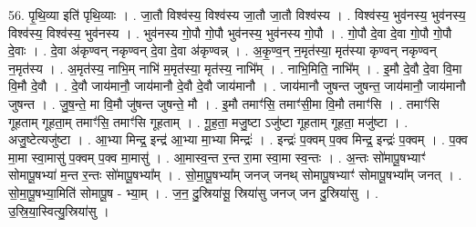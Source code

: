 \documentclass[17pt]{extarticle}
\begin{document}
56. पृ॒थि॒व्या इति॑ पृथि॒व्याः । . जा॒तौ विश्व॑स्य॒ विश्व॑स्य जा॒तौ जा॒तौ विश्व॑स्य । . विश्व॑स्य॒ भुव॑नस्य॒ भुव॑नस्य॒ विश्व॑स्य॒ विश्व॑स्य॒ भुव॑नस्य । . भुव॑नस्य गो॒पौ गो॒पौ भुव॑नस्य॒ भुव॑नस्य गो॒पौ । . गो॒पौ दे॒वा दे॒वा गो॒पौ गो॒पौ दे॒वाः । . दे॒वा अ॑कृण्वन् नकृण्वन् दे॒वा दे॒वा अ॑कृण्वन्न् । . अ॒कृ॒ण्व॒न् न॒मृत॑स्या॒ मृत॑स्या कृण्वन् नकृण्वन् न॒मृत॑स्य । . अ॒मृत॑स्य॒ नाभि॒म् नाभि॑ म॒मृत॑स्या॒ मृत॑स्य॒ नाभि᳚म् । . नाभि॒मिति॒ नाभि᳚म् । . इ॒मौ दे॒वौ दे॒वा वि॒मा वि॒मौ दे॒वौ । . दे॒वौ जाय॑मानौ॒ जाय॑मानौ दे॒वौ दे॒वौ जाय॑मानौ । . जाय॑मानौ जुषन्त जुषन्त॒ जाय॑मानौ॒ जाय॑मानौ जुषन्त । . जु॒ष॒न्ते॒ मा वि॒मौ जु॑षन्त जुषन्ते॒ मौ । . इ॒मौ तमाꣳ॑सि॒ तमाꣳ॑सी॒मा वि॒मौ तमाꣳ॑सि । . तमाꣳ॑सि गूहताम् गूहता॒म् तमाꣳ॑सि॒ तमाꣳ॑सि गूहताम् । . गू॒ह॒ता॒ मजु॒ष्टा ऽजु॑ष्टा गूहताम् गूहता॒ मजु॑ष्टा । . अजु॒ष्टेत्यजु॑ष्टा । . आ॒भ्या मिन्द्र॒ इन्द्र॑ आ॒भ्या मा॒भ्या मिन्द्रः॑ । . इन्द्रः॑ प॒क्वम् प॒क्व मिन्द्र॒ इन्द्रः॑ प॒क्वम् । . प॒क्व मा॒मा स्वा॒मासु॑ प॒क्वम् प॒क्व मा॒मासु॑ । . आ॒मास्व॒न्त र॒न्त रा॒मा स्वा॒मा स्व॒न्तः । . अ॒न्तः सो॑मापू॒षभ्याꣳ॑ सोमापू॒षभ्या॑ म॒न्त र॒न्तः सो॑मापू॒षभ्या᳚म् । . सो॒मा॒पू॒षभ्या᳚म् जनज् जनथ् सोमापू॒षभ्याꣳ॑ सोमापू॒षभ्या᳚म् जनत् । . सो॒मा॒पू॒षभ्या॒मिति॑ सोमापू॒ष - भ्या॒म् । . ज॒न॒ दु॒स्रिया॑सू॒ स्रिया॑सु जनज् जन दु॒स्रिया॑सु । . उ॒स्रि॒या॒स्वित्यु॒स्रिया॑सु । \newline
\end{document}
